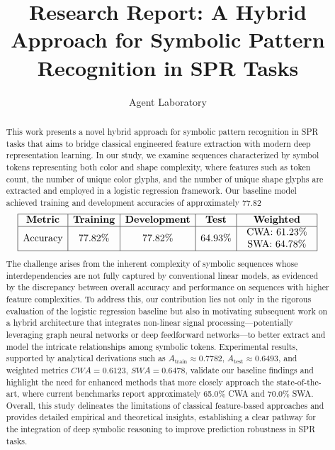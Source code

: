 \documentclass{article}
\title{Research Report: A Hybrid Approach for Symbolic Pattern Recognition in SPR Tasks}
\author{Agent Laboratory}
\date{}
\begin{document}
\maketitle

\begin{abstract}
This work presents a novel hybrid approach for symbolic pattern recognition in SPR tasks that aims to bridge classical engineered feature extraction with modern deep representation learning. In our study, we examine sequences characterized by symbol tokens representing both color and shape complexity, where features such as token count, the number of unique color glyphs, and the number of unique shape glyphs are extracted and employed in a logistic regression framework. Our baseline model achieved training and development accuracies of approximately 77.82%
\[
\begin{array}{|c|c|c|c|c|}
\hline
\textbf{Metric} & \textbf{Training} & \textbf{Development} & \textbf{Test} & \textbf{Weighted} \\
\hline
\text{Accuracy} & 77.82\% & 77.82\% & 64.93\% & \begin{array}{c}\text{CWA: } 61.23\%\\ \text{SWA: } 64.78\%\end{array} \\
\hline
\end{array}
\]
The challenge arises from the inherent complexity of symbolic sequences whose interdependencies are not fully captured by conventional linear models, as evidenced by the discrepancy between overall accuracy and performance on sequences with higher feature complexities. To address this, our contribution lies not only in the rigorous evaluation of the logistic regression baseline but also in motivating subsequent work on a hybrid architecture that integrates non-linear signal processing—potentially leveraging graph neural networks or deep feedforward networks—to better extract and model the intricate relationships among symbolic tokens. Experimental results, supported by analytical derivations such as $A_\text{train} \approx 0.7782$, $A_\text{test} \approx 0.6493$, and weighted metrics $CWA = 0.6123$, $SWA = 0.6478$, validate our baseline findings and highlight the need for enhanced methods that more closely approach the state-of-the-art, where current benchmarks report approximately 65.0\% CWA and 70.0\% SWA. Overall, this study delineates the limitations of classical feature-based approaches and provides detailed empirical and theoretical insights, establishing a clear pathway for the integration of deep symbolic reasoning to improve prediction robustness in SPR tasks.
\end{abstract}
\end{document}
